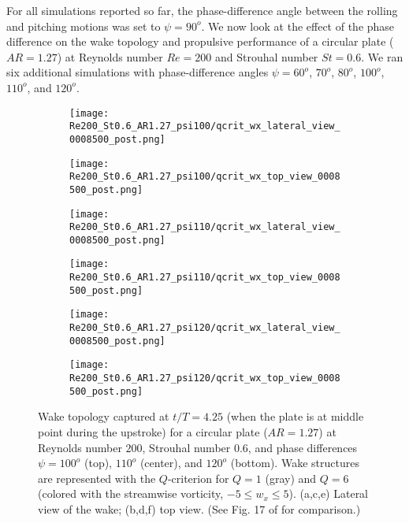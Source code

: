 For all simulations reported so far, the phase-difference angle between the rolling and pitching motions was set to $\psi = 90^o$.
We now look at the effect of the phase difference on the wake topology and propulsive performance of a circular plate ($AR = 1.27$) at Reynolds number $Re = 200$ and Strouhal number $St = 0.6$.
We ran six additional simulations with phase-difference angles $\psi = 60^o$, $70^o$, $80^o$, $100^o$, $110^o$, and $120^o$.

\begin{figure}[!h]
  \centering
  \begin{subfigure}[]{0.45\textwidth}
    \centering
    \texttt{[image: Re200\_St0.6\_AR1.27\_psi100/qcrit\_wx\_lateral\_view\_0008500\_post.png]}
    \caption{}
    \label{fig:phase_wake_topology:100_lateral}
  \end{subfigure}
  \hfill
  \begin{subfigure}[]{0.45\textwidth}
    \centering
    \texttt{[image: Re200\_St0.6\_AR1.27\_psi100/qcrit\_wx\_top\_view\_0008500\_post.png]}
    \caption{}
    \label{fig:phase_wake_topology:100_top}
  \end{subfigure}
  \vspace{1cm}
  \begin{subfigure}[]{0.45\textwidth}
    \centering
    \texttt{[image: Re200\_St0.6\_AR1.27\_psi110/qcrit\_wx\_lateral\_view\_0008500\_post.png]}
    \caption{}
    \label{fig:phase_wake_topology:110_lateral}
  \end{subfigure}
  \hfill
  \begin{subfigure}[]{0.45\textwidth}
    \centering
    \texttt{[image: Re200\_St0.6\_AR1.27\_psi110/qcrit\_wx\_top\_view\_0008500\_post.png]}
    \caption{}
    \label{fig:phase_wake_topology:110_top}
  \end{subfigure}
  \vspace{1cm}
  \begin{subfigure}[]{0.45\textwidth}
    \centering
    \texttt{[image: Re200\_St0.6\_AR1.27\_psi120/qcrit\_wx\_lateral\_view\_0008500\_post.png]}
    \caption{}
    \label{fig:phase_wake_topology:120_lateral}
  \end{subfigure}
  \hfill
  \begin{subfigure}[]{0.45\textwidth}
    \centering
    \texttt{[image: Re200\_St0.6\_AR1.27\_psi120/qcrit\_wx\_top\_view\_0008500\_post.png]}
    \caption{}
    \label{fig:phase_wake_topology:120_top}
  \end{subfigure}
  \caption{Wake topology captured at $t / T = 4.25$ (when the plate is at middle point during the upstroke) for a circular plate ($AR = 1.27$) at Reynolds number $200$, Strouhal number $0.6$, and phase differences $\psi = 100^o$ (top), $110^o$ (center), and $120^o$ (bottom). Wake structures are represented with the $Q$-criterion for $Q = 1$ (gray) and $Q = 6$ (colored with the streamwise vorticity, $-5 \leq w_x \leq 5$). (a,c,e) Lateral view of the wake; (b,d,f) top view. (See Fig. 17 of \citet{li_dong_2016} for comparison.)}
  \label{fig:phase_wake_topology}
\end{figure}

